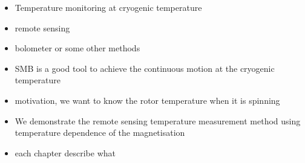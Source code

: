 \begin{itemize}
\item Temperature monitoring at cryogenic temperature
\item remote sensing
\item bolometer or some other methods
\item SMB is a good tool to achieve the continuous motion at the cryogenic temperature
\item motivation, we want to know the rotor temperature when it is spinning
\item We demonstrate the remote sensing temperature measurement method using temperature dependence of the magnetisation
\item each chapter describe what
\end{itemize}
